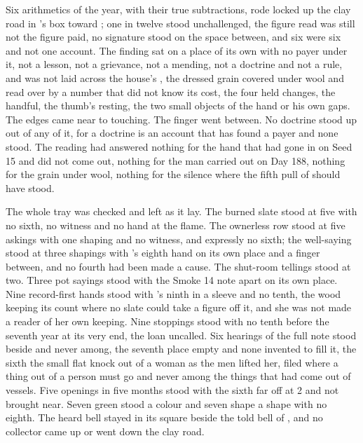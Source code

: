 Six arithmetics of the year, with their true subtractions, rode locked up the clay road in 's box toward ; one in twelve stood unchallenged, the figure read was still not the figure paid, no signature stood on the space between, and six were six and not one account. The finding sat on a place of its own with no payer under it, not a lesson, not a grievance, not a mending, not a doctrine and not a rule, and was not laid across the house's , the dressed grain covered under wool and read over by a number that did not know its cost, the four held changes, the handful, the thumb's resting, the two small objects of the hand or his own gaps. The edges came near to touching. The finger went between. No doctrine stood up out of any of it, for a doctrine is an account that has found a payer and none stood. The reading had answered nothing for the hand that had gone in on Seed 15 and did not come out, nothing for the man carried out on Day 188, nothing for the grain under wool, nothing for the silence where the fifth pull of  should have stood.

The whole tray was checked and left as it lay. The burned slate stood at five with no sixth, no witness and no hand at the flame. The ownerless row stood at five askings with one shaping and no witness, and expressly no sixth; the well-saying stood at three shapings with 's eighth hand on its own place and a finger between, and no fourth had been made a cause. The shut-room tellings stood at two. Three pot sayings stood with the Smoke 14 note apart on its own place. Nine record-first hands stood with 's ninth in a sleeve and no tenth, the wood keeping its count where no slate could take a figure off it, and she was not made a reader of her own keeping. Nine stoppings stood with no tenth before the seventh year at its very end, the loan uncalled. Six hearings of the full note stood beside and never among, the seventh place empty and none invented to fill it, the sixth the small flat knock out of a woman as the men lifted her, filed where a thing out of a person must go and never among the things that had come out of vessels. Five openings in five months stood with the sixth far off at  2 and not brought near. Seven green stood a colour and seven shape a shape with no eighth. The heard bell stayed in its square beside the told bell of , and no collector came up or went down the clay road.

